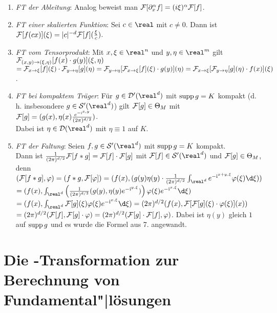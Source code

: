 \begin{enumerate}
    \item
    \emph{FT der Ableitung}:
    Analog beweist man $\mathcal{F}[\partial_x^\alpha f] = (i\xi)^\alpha \mathcal{F}[f]$.

    \item
    \emph{FT einer skalierten Funktion}:
    Sei $c \in \real$ mit $c \not= 0$.
    Dann ist $\mathcal{F}[f(cx)](\xi) = |c|^{-d} \mathcal{F}[f](\frac{\xi}{c})$.

    \item
    \emph{FT vom Tensorprodukt}:
    Mit $x, \xi \in \real^n$ und $y, \eta \in \real^m$ gilt
    $\mathcal{F}_{(x, y) \to (\xi, \eta)}[f(x) \cdot g(y)](\xi, \eta)$\\
    $= \mathcal{F}_{x \to \xi}[f](\xi) \cdot \mathcal{F}_{y \to \eta}[g](\eta) =
    \mathcal{F}_{y \to \eta}[\mathcal{F}_{x \to \xi}[f](\xi) \cdot g(y)](\eta) =
    \mathcal{F}_{x \to \xi}[\mathcal{F}_{y \to \eta}[g](\eta) \cdot f(x)](\xi)$.

    \item
    \emph{FT bei kompaktem Träger}:
    Für $g \in \D'(\real^d)$ mit $\operatorname{supp} g = K$ kompakt
    (d.\,h. insbesondere $g \in \S'(\real^d)$) gilt
    $\mathcal{F}[g] \in \Theta_M$ mit
    $\mathcal{F}[g] = (g(x), \eta(x)\frac{e^{-\mathrm{i}\sp{x, y}}}{(2\pi)^{d/2}})$.\\
    Dabei ist $\eta \in \D(\real^d)$ mit $\eta \equiv 1$ auf $K$.

    \item
    \emph{FT der Faltung}:
    Seien $f, g \in \S'(\real^d)$ mit $\operatorname{supp} g = K$ kompakt.\\
    Dann ist $\frac{1}{(2\pi)^{d/2}} \mathcal{F}[f \ast g] = \mathcal{F}[f] \cdot \mathcal{F}[g]$
    mit $\F[f] \in \S'(\real^d)$ und $\mathcal{F}[g] \in \Theta_M$, denn\\
    $(\F[f \ast g], \varphi) = (f \ast g, \F[\varphi]) =
    (f(x), (g(y)\eta(y) \cdot \frac{1}{(2\pi)^{d/2}}
    \int_{\real^d} e^{-\i\sp{x + y, \xi}}\varphi(\xi)\d\xi))$\\
    $= (f(x), \int_{\real^d}
    \left(\frac{1}{(2\pi)^{d/2}} (g(y), \eta(y)e^{-\i\sp{y, \xi}})\right)
    \varphi(\xi)e^{-\i\sp{x, \xi}}\d\xi)$\\
    $= (f(x), \int_{\real^d} \F[g](\xi)\varphi(\xi)e^{-\i\sp{x, \xi}}\d\xi) =
    (2\pi)^{d/2} (f(x), \F[\F[g](\xi) \cdot \varphi(\xi)](x))$\\
    $= (2\pi)^{d/2} (\mathcal{F}[f], \mathcal{F}[g] \cdot \varphi) =
    (2\pi)^{d/2} (\mathcal{F}[g] \cdot \mathcal{F}[f], \varphi)$.
    Dabei ist $\eta(y)$ gleich $1$ auf $\operatorname{supp} g$ und es wurde die Formel aus
    7. angewandt.
\end{enumerate}

\section{%
    Die -Transformation zur Berechnung von Fundamental"|lösungen%
}

